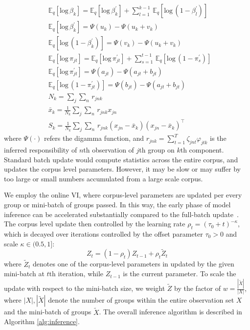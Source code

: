 \documentclass{article}
\begin{document}
\begin{align}\label{eq:expectations_and_suffstats}
    &\mathbb{E}_{q}[\text{log}\,\beta_{k}] = \mathbb{E}_{q}[\text{log}\,\beta_{k}^{\prime}] + \textstyle\sum_{l=1}^{k-1}\,\mathbb{E}_{q}[\text{log}\,(1 - \beta_{l}^{\prime})] \nonumber\\
    &\mathbb{E}_{q}[\text{log}\,\beta_{k}^{\prime}] = \Psi(u_{k}) - \Psi(u_{k} + v_{k}) \nonumber\\
    &\mathbb{E}_{q}[\text{log}\,(1 - \beta_{k}^{\prime})] = \Psi(v_{k}) - \Psi(u_{k} + v_{k}) \nonumber\\
    &\mathbb{E}_{q}[\text{log}\,\pi_{jt}] = \mathbb{E}_{q}[\text{log}\,\pi_{jt}^{\prime}] + \textstyle\sum_{s=1}^{t-1}\,\mathbb{E}_{q}[\text{log}\,(1 - \pi_{s}^{\prime})] \nonumber\\
    &\mathbb{E}_{q}[\text{log}\,\pi_{jt}^{\prime}] = \Psi(a_{jt}) - \Psi(a_{jt} + b_{jt}) \nonumber\\
    &\mathbb{E}_{q}[\text{log}\,(1 - \pi_{jt}^{\prime})] = \Psi(b_{jt}) - \Psi(a_{jt} + b_{jt}) \nonumber\\
    &N_{k} = \textstyle\sum_{j}\sum_{n}\,r_{jnk} \nonumber\\
    &\bar{x}_{k} = \frac{1}{N_{k}}\textstyle\sum_{j}\sum_{n}\,r_{jnk}x_{jn} \nonumber\\
    &S_{k} = \frac{1}{N_{k}}\textstyle\sum_{j}\sum_{n}\,r_{jnk}(x_{jn} - \bar{x}_{k})(x_{jn} - \bar{x}_{k})^{\intercal} \nonumber
\end{align}
where $\Psi(\cdot)$ refers the digamma function, and $r_{jnk} = \sum_{t=1}^{T} \zeta_{jnt}\varphi_{jtk}$ is the inferred responsibility of $n$th observation of $j$th group on $k$th component. Standard batch update would compute statistics across the entire corpus, and updates the corpus level parameters. However, it may be slow or may suffer by too large or small numbers accumulated from a large scale corpus.

We employ the online VI, where corpus-level parameters are updated per every group or mini-batch of groups passed. In this way, the early phase of model inference can be accelerated substantially compared to the full-batch update~\cite{DBLP:journals/jmlr/WangPB11, DBLP:conf/nips/HoffmanBB10}. The corpus level update then controlled by the learning rate $\rho_{t} = (\tau_{0} + t)^{-\kappa}$, which is decayed over iterations controlled by the offset parameter $\tau_{0} > 0$ and scale $\kappa \in (0.5, 1]$:
\begin{equation}\label{eq:minibatch_update}
    Z_{t} = (1 - \rho_{t})Z_{t - 1} + \rho_{t}\tilde{Z}_{t}
\end{equation}
where $\tilde{Z}_{t}$ denotes one of the corpus-level parameters in  updated by the given mini-batch at $t$th iteration, while $Z_{t-1}$ is the current parameter. To scale the update with respect to the mini-batch size, we weight $\tilde{Z}$ by the factor of $w = \frac{|\tilde{X}|}{|X|}$, where $|X|, |\tilde{X}|$ denote the number of groups within the entire observation set $X$ and the mini-batch of groups $\tilde{X}$. The overall inference algorithm is described in Algorithm \ref{alg:inference}.
\end{document}
